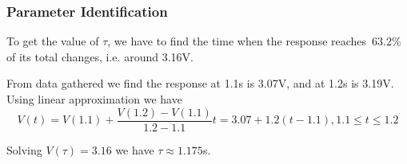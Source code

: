 \subsubsection*{Parameter Identification}
To get the value of $\tau$, we have to find the time when the response reaches\
63.2\% of its total changes, i.e. around 3.16V.

From data gathered we find the response at 1.1s is 3.07V, and at 1.2s is 3.19V.
Using linear approximation we have 
\[V(t) = V(1.1) + \frac{V(1.2)-V(1.1)}{1.2-1.1}t = 3.07+1.2(t-1.1),
                                                          1.1\leq t \leq 1.2\]

Solving $V(\tau)=3.16$ we have $\tau\approx 1.175$s.

